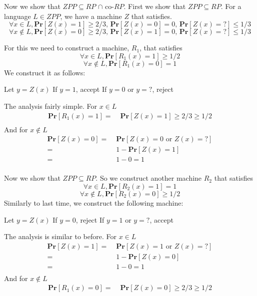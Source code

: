 \documentclass[english]{article}
\begin{document}
Now we show that $ZPP \subseteq RP$ $\cap$ co-$RP$. First we show that $ZPP \subseteq RP$.
For a language $L \in ZPP$, we have a machine $Z$ that satisfies.
\[\forall x \in L, \mathbf{Pr}[Z(x) = 1] \ge 2/3,\,\mathbf{Pr}[Z(x) = 0] = 0,\,\mathbf{Pr}[Z(x) = ?] \le 1/3 \]
\[\forall x \notin L, \mathbf{Pr}[Z(x) = 0] \ge 2/3,\,\mathbf{Pr}[Z(x) = 1] = 0,\,\mathbf{Pr}[Z(x) = ?] \le 1/3\]

For this we need to construct a machine, $R_1$, that satisfies
\[\forall x \in L, \mathbf{Pr}[R_1(x) = 1] \ge 1/2\]
\[\forall x \notin L, \mathbf{Pr}[R_1(x) = 0] = 1\]
We construct it as follows:
\begin{algorithmic}
  \State Let $y = Z(x)$
  \State If $y = 1$, accept
  \State If $y = 0$ or $y = ?$, reject
\EndFunction 
\end{algorithmic}
The analysis fairly simple. For $x \in L$
\begin{align*}
\mathbf{Pr}[R_1(x) = 1]
  =&\; \mathbf{Pr}[Z(x) = 1] \ge 2/3 \ge 1/2 \\
\end{align*}
And for $x \notin L$
\begin{align*}
\mathbf{Pr}[Z(x) = 0]
  =&\; \mathbf{Pr}[Z(x) = 0 \textrm{ or } Z(x) = ?] \\
  =&\; 1 - \mathbf{Pr}[Z(x) = 1] \\
  =&\; 1 - 0 = 1 \\
\end{align*}

Now we show that $ZPP \subseteq RP$. So we construct another machine $R_2$ that satisfies
\[\forall x \in L, \mathbf{Pr}[R_2(x) = 1] = 1\]
\[\forall x \notin L, \mathbf{Pr}[R_2(x) = 0] \ge 1/2\]
Similarly to last time, we construct the following machine:
\begin{algorithmic}
  \State Let $y = Z(x)$
  \State If $y = 0$, reject
  \State If $y = 1$ or $y = ?$, accept
\EndFunction 
\end{algorithmic}
The analysis is similar to before. For $x \in L$
\begin{align*}
\mathbf{Pr}[Z(x) = 1]
  =&\; \mathbf{Pr}[Z(x) = 1 \textrm{ or } Z(x) = ?] \\
  =&\; 1 - \mathbf{Pr}[Z(x) = 0] \\
  =&\; 1 - 0 = 1 \\
\end{align*}
And for $x \notin L$
\begin{align*}
\mathbf{Pr}[R_1(x) = 0]
  =&\; \mathbf{Pr}[Z(x) = 0] \ge 2/3 \ge 1/2 \\
\end{align*}
\end{document}
